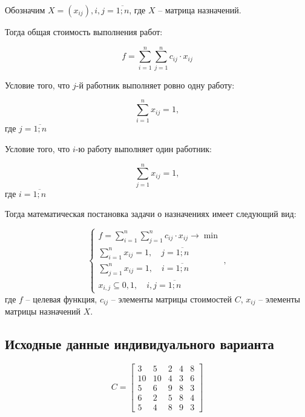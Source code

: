 Обозначим $X=(x_{ij}), {i,j = \overline{1;n}}$, где $X$ -- матрица назначений.

Тогда общая стоимость выполнения работ:

\begin{equation}
f=\sum\limits_{i=1}^n\sum\limits_{j=1}^n c_{ij} \cdot x_{ij}
\end{equation}

Условие того, что $j$-й работник выполняет ровно одну работу:

\begin{equation}
\sum\limits_{i=1}^n x_{ij} = 1,
\end{equation}
где $j = \overline{1;n}$

Условие того, что $i$-ю работу выполняет один работник:

\begin{equation}
\sum\limits_{j=1}^n x_{ij} = 1,
\end{equation}
где $i = \overline{1;n}$

Тогда математическая постановка задачи о назначениях имеет следующий вид:

\begin{equation}
 \begin{cases}
   f=\sum\limits_{i=1}^n\sum\limits_{j=1}^n c_{ij} \cdot x_{ij} \rightarrow \min
   \\
   \sum\limits_{i=1}^n x_{ij} = 1, \quad j = \overline{1;n}
   \\
   \sum\limits_{j=1}^n x_{ij} = 1, \quad i = \overline{1;n}
   \\
   x_{i,j}\subseteq{0,1}, \quad i,j = \overline{1;n}
 \end{cases},  
\end{equation}
где $f$ -- целевая функция, $c_{ij}$ -- элементы матрицы стоимостей $C$, $x_{ij}$ -- элементы матрицы назначений $X$.


\subsection{Исходные данные индивидуального варианта}

\begin{equation*}
    C = 
\begin{bmatrix}
3 & 5 & 2 & 4 & 8\\
10 & 10 & 4 & 3 & 6\\
5 & 6 & 9 & 8 & 3\\
6 & 2 & 5 & 8 & 4\\
5 & 4 & 8 & 9 & 3
\end{bmatrix}
\end{equation*}


